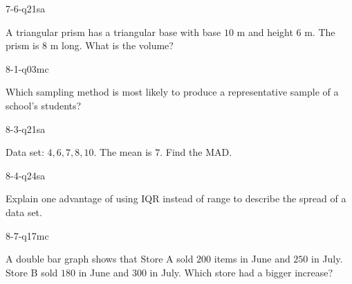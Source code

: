 \begin{practiceQuestion}{7-6-q21}{sa}
\begin{questionText}
A triangular prism has a triangular base with base $10$ m and height $6$ m. The prism is $8$ m long. What is the volume?
\end{questionText}
\end{practiceQuestion}

\begin{practiceQuestion}{8-1-q03}{mc}
\begin{questionText}
Which sampling method is most likely to produce a representative sample of a school's students?
\end{questionText}
\end{practiceQuestion}

\begin{practiceQuestion}{8-3-q21}{sa}
\begin{questionText}
Data set: $4, 6, 7, 8, 10$. The mean is $7$. Find the MAD.
\end{questionText}
\end{practiceQuestion}

\begin{practiceQuestion}{8-4-q24}{sa}
\begin{questionText}
Explain one advantage of using IQR instead of range to describe the spread of a data set.
\end{questionText}
\end{practiceQuestion}

\begin{practiceQuestion}{8-7-q17}{mc}
\begin{questionText}
A double bar graph shows that Store A sold $200$ items in June and $250$ in July. Store B sold $180$ in June and $300$ in July. Which store had a bigger increase?
\end{questionText}
\end{practiceQuestion}

